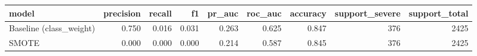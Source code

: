 \begin{tabular}{lrrrrrrrr}
\toprule
model & precision & recall & f1 & pr_auc & roc_auc & accuracy & support_severe & support_total \\
\midrule
Baseline (class_weight) & 0.750 & 0.016 & 0.031 & 0.263 & 0.625 & 0.847 & 376 & 2425 \\
SMOTE & 0.000 & 0.000 & 0.000 & 0.214 & 0.587 & 0.845 & 376 & 2425 \\
\bottomrule
\end{tabular}
